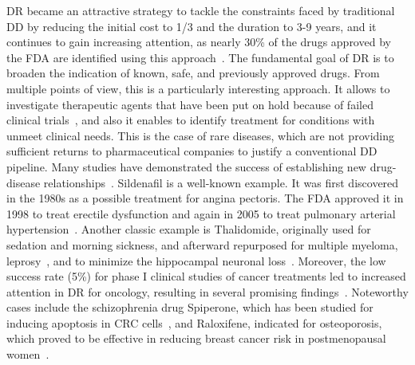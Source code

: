 \gls{DR} became an attractive strategy to tackle the constraints faced by traditional \gls{DD} by reducing the initial cost to 1/3 and the duration to 3-9 years, and it continues to gain increasing attention, as nearly 30\% of the drugs approved by the \gls{FDA} are identified using this approach~\cite{RN54,RN64}. 
The fundamental goal of \gls{DR} is to broaden the indication of known, safe, and previously approved drugs. 
From multiple points of view, this is a particularly interesting approach. 
It allows to investigate therapeutic agents that have been put on hold because of failed clinical trials~\cite{RN62}, and also it enables to identify treatment for conditions with unmeet clinical needs. 
This is the case of rare diseases, which are not providing sufficient returns to pharmaceutical companies to justify a conventional \gls{DD} pipeline. 
Many studies have demonstrated the success of establishing new drug-disease relationships~\cite{RN48}. 
Sildenafil is a well-known example. It was first discovered in the 1980s as a possible treatment for angina pectoris. The \gls{FDA} approved it in 1998 to treat erectile dysfunction and again in 2005 to treat pulmonary arterial hypertension~\cite{RN54, RN64, RN94}.
Another classic example is Thalidomide, originally used for sedation and morning sickness, and afterward repurposed for multiple myeloma, leprosy~\cite{RN54, RN64}, and to minimize the hippocampal neuronal loss~\cite{RN50}. Moreover, the low success rate (5\%) for phase I clinical studies of cancer treatments led to increased attention in \gls{DR} for oncology, resulting in several promising findings~\cite{RN64, RN63}. 
Noteworthy cases include the schizophrenia drug Spiperone, which has been studied for inducing apoptosis in \gls{CRC} cells~\cite{RN51}, and Raloxifene, indicated for osteoporosis, which proved to be effective in reducing breast cancer risk in postmenopausal women~\cite{RN64, RN61}.

